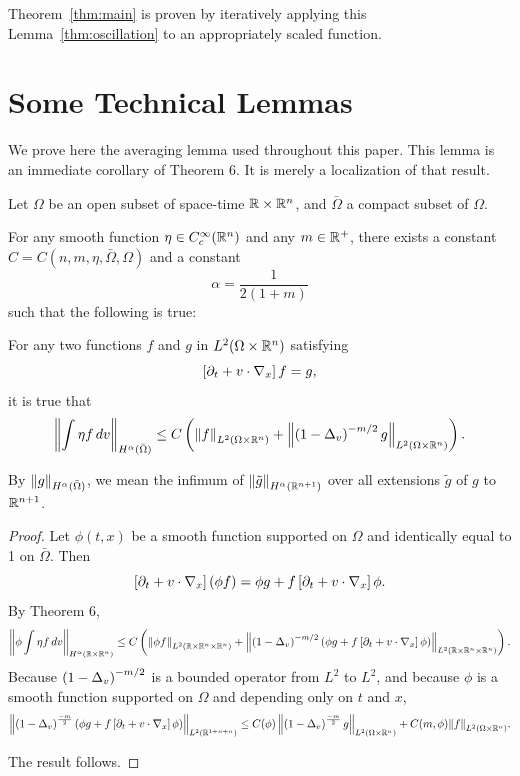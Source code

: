 Theorem~\ref{thm:main} is proven by iteratively applying this Lemma~\ref{thm:oscillation} to an appropriately scaled function.  


\appendix
\section{Some Technical Lemmas}\label{sec:appendix}

We prove here the averaging lemma used throughout this paper.  
This lemma is an immediate corollary of \cite{Be} Theorem 6.  It is merely a localization of that result.  
\begin{lemma}\label{thm:avg_lemma}
Let $\Omega$ be an open subset of space-time $\mathbb{R} \times \mathbb{R}^n$, and $\bar{\Omega}$ a compact subset of $\Omega$.  

For any smooth function $\eta \in C_c^\infty(\mathbb{R}^n)$ and any $m \in \mathbb{R}^+$, there exists a constant $C = C(n,m,\eta, \bar{\Omega}, \Omega)$ and a constant
\[ \alpha = \frac{1}{2(1+m)} \]
such that the following is true:

For any two functions $f$ and $g$ in $L^2(\Omega \times \mathbb{R}^n)$ satisfying
\[ \left[ \partial_t + v\cdot \nabla_x \right] f = g, \]
it is true that
\[ \left\lVert\int \eta f \,dv\right\rVert_{H^\alpha(\bar{\Omega})} \leq C \left( \left\lVert f\right\rVert_{L^2(\Omega \times \mathbb{R}^n)} + \left\lVert\left( 1-\Delta_v \right)^{-m/2} g\right\rVert_{L^2(\Omega\times\mathbb{R}^n)} \right). \]
%
\end{lemma}

By $\left\lVert g\right\rVert_{H^\alpha(\bar{\Omega})}$, we mean the infimum of $\left\lVert\tilde{g}\right\rVert_{H^\alpha(\mathbb{R}^{n+1})}$ over all extensions $\tilde{g}$ of $g$ to $\mathbb{R}^{n+1}$.  

\begin{proof}
Let $\phi(t,x)$ be a smooth function supported on $\Omega$ and identically equal to 1 on $\bar{\Omega}$.  Then
\[ \left[ \partial_t + v\cdot \nabla_x \right] (\phi f) = \phi g + f \left[ \partial_t + v\cdot \nabla_x \right] \phi. \]
By \cite{Be} Theorem 6,
\[ \left\lVert\phi \int \eta f \,dv\right\rVert_{H^\alpha(\mathbb{R} \times \mathbb{R}^n)} \leq C \left( \left\lVert\phi f\right\rVert_{L^2(\mathbb{R} \times \mathbb{R}^n \times \mathbb{R}^n)} + \left\lVert\left( 1-\Delta_v \right)^{-m/2} \left( \phi g + f \left[ \partial_t + v\cdot \nabla_x \right] \phi \right)\right\rVert_{L^2(\mathbb{R} \times \mathbb{R}^n \times \mathbb{R}^n)} \right). \]
Because $\left( 1-\Delta_v \right)^{-m/2}$ is a bounded operator from $L^2$ to $L^2$, and because $\phi$ is a smooth function supported on $\Omega$ and depending only on $t$ and $x$, 
\[ \left\lVert\left( 1-\Delta_v \right)^{\frac{-m}{2}} \left( \phi g + f \left[ \partial_t + v\cdot \nabla_x \right] \phi \right)\right\rVert_{L^2(\mathbb{R}^{1+n+n})} \leq C(\phi) \left\lVert\left( 1-\Delta_v \right)^{\frac{-m}{2}}g\right\rVert_{L^2(\Omega\times \mathbb{R}^n)} + C(m,\phi)\! \left\lVert f\right\rVert_{L^2(\Omega\times\mathbb{R}^n)}\!. \]

The result follows.  
\end{proof}

